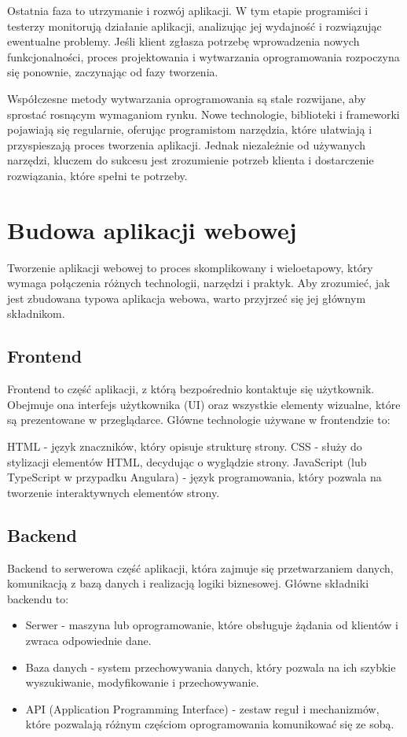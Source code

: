 Ostatnia faza to utrzymanie i rozwój aplikacji. W tym etapie programiści i testerzy monitorują działanie aplikacji, analizując jej wydajność i rozwiązując ewentualne problemy. Jeśli klient zgłasza potrzebę wprowadzenia nowych funkcjonalności, proces projektowania i wytwarzania oprogramowania rozpoczyna się ponownie, zaczynając od fazy tworzenia.

Współczesne metody wytwarzania oprogramowania są stale rozwijane, aby sprostać rosnącym wymaganiom rynku. Nowe technologie, biblioteki i frameworki pojawiają się regularnie, oferując programistom narzędzia, które ułatwiają i przyspieszają proces tworzenia aplikacji. Jednak niezależnie od używanych narzędzi, kluczem do sukcesu jest zrozumienie potrzeb klienta i dostarczenie rozwiązania, które spełni te potrzeby.


\section{Budowa aplikacji webowej}

Tworzenie aplikacji webowej to proces skomplikowany i wieloetapowy, który wymaga połączenia różnych technologii, narzędzi i praktyk. Aby zrozumieć, jak jest zbudowana typowa aplikacja webowa, warto przyjrzeć się jej głównym składnikom.

\subsection{Frontend}

Frontend to część aplikacji, z którą bezpośrednio kontaktuje się użytkownik. Obejmuje ona interfejs użytkownika (UI) oraz wszystkie elementy wizualne, które są prezentowane w przeglądarce. Główne technologie używane w frontendzie to:

HTML - język znaczników, który opisuje strukturę strony.
CSS - służy do stylizacji elementów HTML, decydując o wyglądzie strony.
JavaScript (lub TypeScript w przypadku Angulara) - język programowania, który pozwala na tworzenie interaktywnych elementów strony.

\subsection{Backend}

Backend to serwerowa część aplikacji, która zajmuje się przetwarzaniem danych, komunikacją z bazą danych i realizacją logiki biznesowej. Główne składniki backendu to:

\begin{itemize}
\item Serwer - maszyna lub oprogramowanie, które obsługuje żądania od klientów i zwraca odpowiednie dane.
\item Baza danych - system przechowywania danych, który pozwala na ich szybkie wyszukiwanie, modyfikowanie i przechowywanie.
\item API (Application Programming Interface) - zestaw reguł i mechanizmów, które pozwalają różnym częściom oprogramowania komunikować się ze sobą.
\end{itemize}

